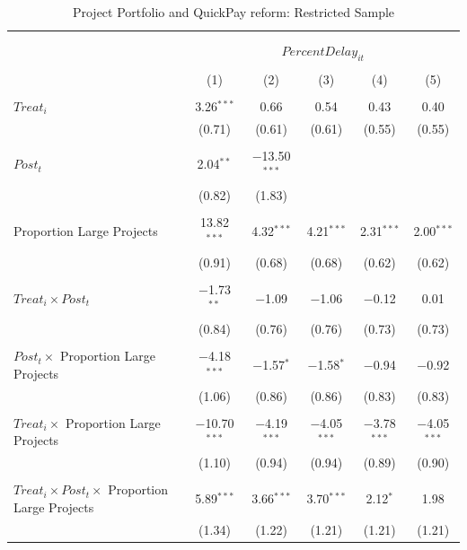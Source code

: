 \documentclass[
]{article}
\begin{document}
\begin{table}[H] \centering 
  \caption{Project Portfolio and QuickPay reform: Restricted Sample} 
  \label{} 
\small 
\begin{tabular}{@{\extracolsep{-2pt}}lccccc} 
\\[-1.8ex]\hline 
\hline \\[-1.8ex] 
\\[-1.8ex] & \multicolumn{5}{c}{$PercentDelay_{it}$  } \\ 
\\[-1.8ex] & (1) & (2) & (3) & (4) & (5)\\ 
\hline \\[-1.8ex] 
 $Treat_i$ & 3.26$^{***}$ & 0.66 & 0.54 & 0.43 & 0.40 \\ 
  & (0.71) & (0.61) & (0.61) & (0.55) & (0.55) \\ 
  & & & & & \\ 
 $Post_t$ & 2.04$^{**}$ & $-$13.50$^{***}$ &  &  &  \\ 
  & (0.82) & (1.83) &  &  &  \\ 
  & & & & & \\ 
 Proportion Large Projects & 13.82$^{***}$ & 4.32$^{***}$ & 4.21$^{***}$ & 2.31$^{***}$ & 2.00$^{***}$ \\ 
  & (0.91) & (0.68) & (0.68) & (0.62) & (0.62) \\ 
  & & & & & \\ 
 $Treat_i \times Post_t$ & $-$1.73$^{**}$ & $-$1.09 & $-$1.06 & $-$0.12 & 0.01 \\ 
  & (0.84) & (0.76) & (0.76) & (0.73) & (0.73) \\ 
  & & & & & \\ 
 $Post_t \times$ Proportion Large Projects & $-$4.18$^{***}$ & $-$1.57$^{*}$ & $-$1.58$^{*}$ & $-$0.94 & $-$0.92 \\ 
  & (1.06) & (0.86) & (0.86) & (0.83) & (0.83) \\ 
  & & & & & \\ 
 $Treat_i \times$ Proportion Large Projects & $-$10.70$^{***}$ & $-$4.19$^{***}$ & $-$4.05$^{***}$ & $-$3.78$^{***}$ & $-$4.05$^{***}$ \\ 
  & (1.10) & (0.94) & (0.94) & (0.89) & (0.90) \\ 
  & & & & & \\ 
 $Treat_i \times Post_t \times$ Proportion Large Projects & 5.89$^{***}$ & 3.66$^{***}$ & 3.70$^{***}$ & 2.12$^{*}$ & 1.98 \\ 
  & (1.34) & (1.22) & (1.21) & (1.21) & (1.21) \\ 

\end{tabular}
\end{table}
\end{document}
